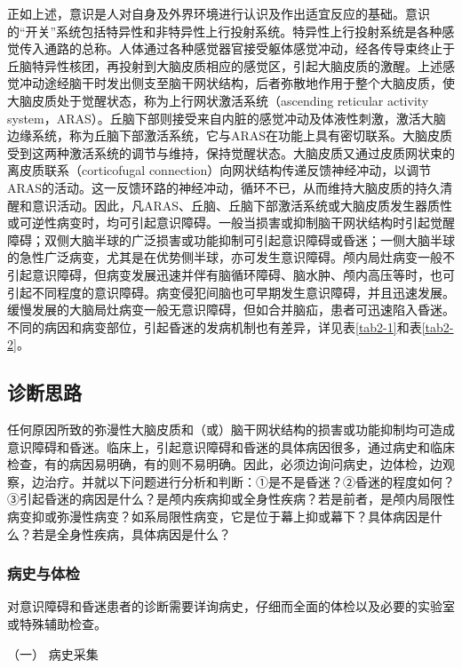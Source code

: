 正如上述，意识是人对自身及外界环境进行认识及作出适宜反应的基础。意识的“开关”系统包括特异性和非特异性上行投射系统。特异性上行投射系统是各种感觉传入通路的总称。人体通过各种感觉器官接受躯体感觉冲动，经各传导束终止于丘脑特异性核团，再投射到大脑皮质相应的感觉区，引起大脑皮质的激醒。上述感觉冲动途经脑干时发出侧支至脑干网状结构，后者弥散地作用于整个大脑皮质，使大脑皮质处于觉醒状态，称为上行网状激活系统（ascending
reticular activity
system，ARAS）。丘脑下部则接受来自内脏的感觉冲动及体液性刺激，激活大脑边缘系统，称为丘脑下部激活系统，它与ARAS在功能上具有密切联系。大脑皮质受到这两种激活系统的调节与维持，保持觉醒状态。大脑皮质又通过皮质网状束的离皮质联系（corticofugal
connection）向网状结构传递反馈神经冲动，以调节ARAS的活动。这一反馈环路的神经冲动，循环不已，从而维持大脑皮质的持久清醒和意识活动。因此，凡ARAS、丘脑、丘脑下部激活系统或大脑皮质发生器质性或可逆性病变时，均可引起意识障碍。一般当损害或抑制脑干网状结构时引起觉醒障碍；双侧大脑半球的广泛损害或功能抑制可引起意识障碍或昏迷；一侧大脑半球的急性广泛病变，尤其是在优势侧半球，亦可发生意识障碍。颅内局灶病变一般不引起意识障碍，但病变发展迅速并伴有脑循环障碍、脑水肿、颅内高压等时，也可引起不同程度的意识障碍。病变侵犯间脑也可早期发生意识障碍，并且迅速发展。缓慢发展的大脑局灶病变一般无意识障碍，但如合并脑疝，患者可迅速陷入昏迷。不同的病因和病变部位，引起昏迷的发病机制也有差异，详见表\ref{tab2-1}和表\ref{tab2-2}。

\subsection{诊断思路}

任何原因所致的弥漫性大脑皮质和（或）脑干网状结构的损害或功能抑制均可造成意识障碍和昏迷。临床上，引起意识障碍和昏迷的具体病因很多，通过病史和临床检查，有的病因易明确，有的则不易明确。因此，必须边询问病史，边体检，边观察，边治疗。并就以下问题进行分析和判断：①是不是昏迷？②昏迷的程度如何？③引起昏迷的病因是什么？是颅内疾病抑或全身性疾病？若是前者，是颅内局限性病变抑或弥漫性病变？如系局限性病变，它是位于幕上抑或幕下？具体病因是什么？若是全身性疾病，具体病因是什么？

\subsubsection{病史与体检}

对意识障碍和昏迷患者的诊断需要详询病史，仔细而全面的体检以及必要的实验室或特殊辅助检查。

\hypertarget{text00010.htmlux5cux23CHP1-2-2-1-1}{}
（一） 病史采集

